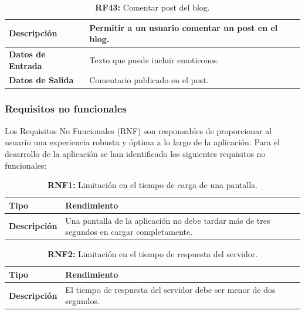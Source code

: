 \documentclass[a4paper, 12pt]{article}
\begin{document}
\begin{table}[H]
\captionsetup{list=no}%
\captionsetup{justification=raggedright,singlelinecheck=false}
\captionsetup{labelformat=empty}
\caption{\textbf{RF43:} Comentar post del blog.}
\label{tab:RF43}
	\begin{tabular}{|m{5cm}|m{10cm}|}
	\hline
	\textbf{Descripción} & Permitir a un usuario comentar un post en el blog. \\ 
	\hline
	\textbf{Datos de Entrada} & Texto que puede incluir emoticonos. \\ 
	\hline
	\textbf{Datos de Salida} & Comentario publicado en el post. \\ 
	\hline
\end{tabular}
\end{table}


\subsubsection{Requisitos no funcionales}

Los Requisitos No Funcionales (RNF) son responsables de proporcionar al usuario una experiencia robusta y óptima a lo largo de la aplicación. Para el desarrollo de la aplicación se han identificado los siguientes requisitos no funcionales:


\begin{table}[H]
\captionsetup{list=no}%
\captionsetup{justification=raggedright,singlelinecheck=false}
\captionsetup{labelformat=empty}
\caption{\textbf{RNF1:} Limitación en el tiempo de carga de una pantalla.}
\label{tab:RNF1}
    \begin{tabular}{|m{5cm}|m{10cm}|}
	    \hline
	    \textbf{Tipo} & Rendimiento \\ 
	    \hline
	    \textbf{Descripción} & Una pantalla de la aplicación no debe tardar más de tres segundos en cargar completamente. \\ 
	    \hline
    \end{tabular}
\end{table}


\begin{table}[H]
\captionsetup{list=no}%
\captionsetup{justification=raggedright,singlelinecheck=false}
\captionsetup{labelformat=empty}
\caption{\textbf{RNF2:} Limitación en el tiempo de respuesta del servidor.}
\label{tab:RNF2}
    \begin{tabular}{|m{5cm}|m{10cm}|}
	    \hline
	    \textbf{Tipo} & Rendimiento \\ 
	    \hline
	    \textbf{Descripción} & El tiempo de respuesta del servidor debe ser menor de dos segundos. \\ 
	    \hline
    \end{tabular}
\end{table}
\end{document}
